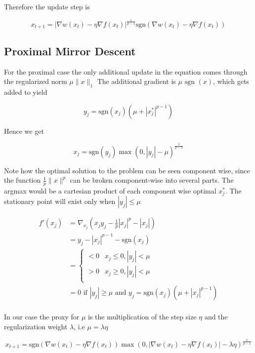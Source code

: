 Therefore the update step is 

\begin{equation}
\label{eq:mirror_descent}
    x_{t+1} =  | \nabla w(x_t) - \eta \nabla f(x_t) |^{\frac{1}{p-1}} \text{sgn}(\nabla w(x_t) - \eta \nabla f(x_t))
\end{equation}

\subsection*{Proximal Mirror Descent}

For the proximal case the only additional update in the equation comes through the regularized norm  $\mu \| x \|_1$
The additional gradient is $\mu \text{ sgn }(x)$, which gets added to yield 

$$
y_j = \text{sgn}(x_j) ( \mu +  |x_j^*|^{p-1} )
$$

Hence we get 

$$
    x_j = \text{sgn}(y_j) \max(0, |y_j| - \mu)^{\frac{1}{p-1}}
$$

Note how the optimal solution to the problem can be seen component wise, since the function $\frac{1}{p} \| x \|^p$ can be broken component-wise into several parts.
The argmax would be a cartesian product of each component wise optimal $x_j^*$. The stationary point will exist only when $|y_j| \le \mu$


\begin{align*}
    f'(x_j) &= \nabla_{x_j} (x_jy_j  - \frac{1}{p} |x_j|^p - |x_j|) \\\
    &= y_j - |x_j|^{p-1} - \text{sgn}(x_j) \\
    &= \begin{cases} 
        < 0 & x_j\leq 0, |y_j| < \mu \\
        > 0  & x_j \geq 0, |y_j| < \mu  \\
     \end{cases}\\
    &= 0 \text{ if } |y_j| \ge \mu \text{ and } y_j = \text{sgn}(x_j) ( \mu + |x_j|^{p-1})\\
\end{align*}

In our case the proxy for $\mu$ is the multiplication of the step size $\eta$ and the regularization weight $\lambda$, i.e $\mu = \lambda \eta$

\begin{equation}
    \label{eq: psmd}
    x_{t + 1} = \text{sgn}(\nabla w(x_t) - \eta \nabla f(x_t)) \max(0, |\nabla w(x_t) - \eta \nabla f(x_t)| - \lambda \eta)^{\frac{1}{p-1}}
\end{equation}

